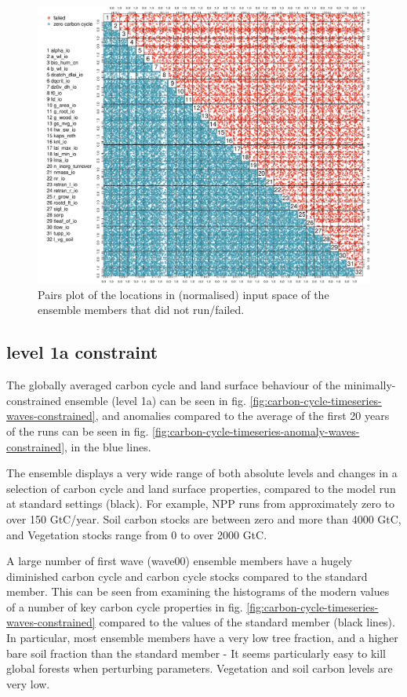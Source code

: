 \documentclass[gmd, manuscript]{copernicus}
\begin{document}
\begin{figure}[t]
\includegraphics[width=12cm]{./graphics/run-failure-pairs.pdf}
\caption{Pairs plot of the locations in (normalised) input space of the ensemble members that did not run/failed.}
\label{fig:run-failure-pairs}
\end{figure}


\subsection{level 1a constraint}\label{sssec:level1a}

The globally averaged carbon cycle and land surface behaviour of the minimally-constrained ensemble (level 1a) can be seen in fig. \ref{fig:carbon-cycle-timeseries-waves-constrained}, and anomalies compared to the average of the first 20 years of the runs can be seen in fig. \ref{fig:carbon-cycle-timeseries-anomaly-waves-constrained}, in the blue lines.

The ensemble displays a very wide range of both absolute levels and changes in a selection of carbon cycle and land surface properties, compared to the model run at standard settings (black). For example, NPP runs from approximately zero to over 150 GtC/year. Soil carbon stocks are between zero and more than 4000 GtC, and Vegetation stocks range from 0 to over 2000 GtC.

A large number of first wave (wave00) ensemble members have a hugely diminished carbon cycle and carbon cycle stocks compared to the standard member. This can be seen from examining the histograms of the modern values of a number of key carbon cycle properties in fig. \ref{fig:carbon-cycle-timeseries-waves-constrained} compared to the values of the standard member (black lines). In particular, most ensemble members have a very low tree fraction, and a higher bare soil fraction than the standard member - It seems particularly easy to kill global forests when perturbing parameters. Vegetation and soil carbon levels are very low. 
\end{document}
